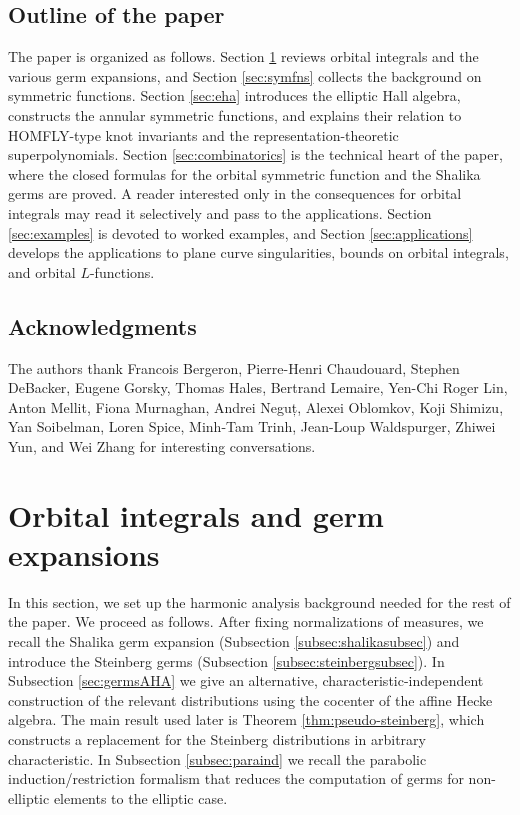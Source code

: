 \documentclass{amsart}
\numberwithin{equation}{section}
\theoremstyle{definition}
\begin{document}
\subsection{Outline of the paper}
The paper is organized as follows. Section \ref{sec:orbitalintegrals} reviews orbital integrals and the various germ expansions, and Section \ref{sec:symfns} collects the background on symmetric functions. Section \ref{sec:eha} introduces the elliptic Hall algebra, constructs the annular symmetric functions, and explains their relation to HOMFLY-type knot invariants and the representation-theoretic superpolynomials. Section \ref{sec:combinatorics} is the technical heart of the paper, where the closed formulas for the orbital symmetric function and the Shalika germs are proved. A reader interested only in the consequences for orbital integrals may read it selectively and pass to the applications. Section \ref{sec:examples} is devoted to worked examples, and Section \ref{sec:applications} develops the applications to plane curve singularities, bounds on orbital integrals, and orbital $L$-functions.

\subsection*{Acknowledgments}
The authors thank Francois Bergeron, Pierre-Henri Chaudouard, Stephen DeBacker, Eugene Gorsky, Thomas Hales, Bertrand Lemaire, Yen-Chi Roger Lin, Anton Mellit, Fiona Murnaghan, Andrei Neguț, Alexei Oblomkov, Koji Shimizu, Yan Soibelman, Loren Spice, Minh-Tam Trinh, Jean-Loup Waldspurger, Zhiwei Yun, and Wei Zhang for interesting conversations.
\section{Orbital integrals and germ expansions}
\label{sec:orbitalintegrals}

In this section, we set up the harmonic analysis background needed for the rest of the paper. We proceed as follows. After fixing normalizations of measures, we recall the Shalika germ expansion (Subsection \ref{subsec:shalikasubsec}) and introduce the Steinberg germs (Subsection \ref{subsec:steinbergsubsec}). In Subsection \ref{sec:germsAHA} we give an alternative, characteristic-independent construction of the relevant distributions using the cocenter of the affine Hecke algebra. The main result used later is Theorem \ref{thm:pseudo-steinberg}, which constructs a replacement for the Steinberg distributions in arbitrary characteristic. In Subsection \ref{subsec:paraind} we recall the parabolic induction/restriction formalism that reduces the computation of germs for non-elliptic elements to the elliptic case. %
\end{document}
